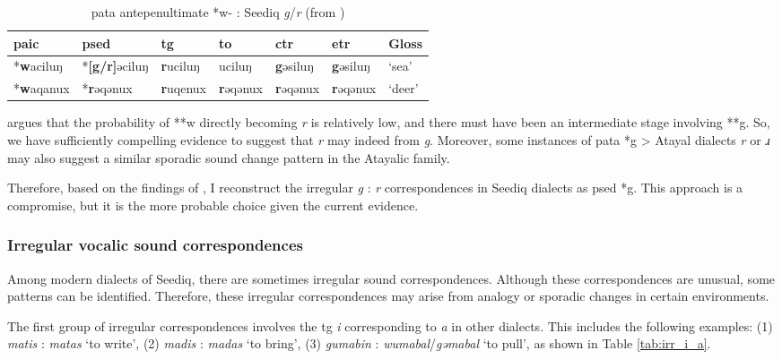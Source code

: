 \begin{table}[!htbp]
\centering
\caption{\acs{pata} antepenultimate *w- : Seediq \textit{g}/\textit{r} (from \cite[13]{song2024Aicg})}
\label{tab:song2024wgr}
\begin{tabular}{lllllll}
\hline
\acs{paic}    & \acs{psed}                & \acs{tg}             & \acs{to}             & \acs{ctr}            & \acs{etr}            & Gloss  \\ \hline
*\textbf{w}aciluŋ & *\textbf{[g/r]}əciluŋ & \textbf{r}uciluŋ & uciluŋ           & \textbf{g}əsiluŋ & \textbf{g}əsiluŋ & `sea'  \\
*\textbf{w}aqanux & *\textbf{r}əqənux    & \textbf{r}uqenux & \textbf{r}əqənux & \textbf{r}əqənux  & \textbf{r}əqənux     & `deer' \\ \hline
\end{tabular}
\end{table}

\textcite[13]{song2024Aicg} argues that the probability of **w directly becoming \textit{r} is relatively low, and there must have been an intermediate stage involving **g. So, we have sufficiently compelling evidence to suggest that \textit{r} may indeed from \textit{g}. Moreover, some instances of \acl{pata} *g > Atayal dialects \textit{r} or \textit{ɹ} may also suggest a similar sporadic sound change pattern in the Atayalic family. 

Therefore, based on the findings of \textcite{song2024Aicg}, I reconstruct the irregular \textit{g} : \textit{r} correspondences in Seediq dialects as \acl{psed} *g. This approach is a compromise, but it is the more probable choice given the current evidence.

\subsubsection{Irregular vocalic sound correspondences} \label{sec:weirdV}

Among modern dialects of Seediq, there are sometimes irregular sound correspondences. Although these correspondences are unusual, some patterns can be identified. Therefore, these irregular correspondences may arise from analogy or sporadic changes in certain environments.

The first group of irregular correspondences involves the \acl{tg} \textit{i} corresponding to \textit{a} in other dialects. This includes the following examples: (1) \textit{matis} : \textit{matas} `to write', (2) \textit{madis} : \textit{madas} `to bring', (3) \textit{gumabin} : \textit{wumabal}/\textit{gəmabal} `to pull', as shown in Table \ref{tab:irr_i_a}.

